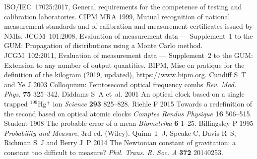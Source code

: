 \documentclass[11pt]{article}
\theoremstyle{plain}
\theoremstyle{definition}
\theoremstyle{remark}
\begin{document}
\begin{thebibliography}{9}
 ISO/IEC~17025:2017, General requirements for the competence of testing and calibration laboratories.
 CIPM MRA 1999, Mutual recognition of national measurement standards and of calibration and measurement certificates issued by NMIs.
 JCGM~101:2008, Evaluation of measurement data — Supplement~1 to the GUM: Propagation of distributions using a Monte Carlo method.
 JCGM~102:2011, Evaluation of measurement data — Supplement~2 to the GUM: Extension to any number of output quantities.
 BIPM, Mise en pratique for the definition of the kilogram (2019, updated), \url{https://www.bipm.org}.
 Cundiff S~T and Ye J 2003 Colloquium: Femtosecond optical frequency combs \textit{Rev. Mod. Phys.} \textbf{75} 325–342.
 Diddams S~A et~al. 2001 An optical clock based on a single trapped $^{199}$Hg$^+$ ion \textit{Science} \textbf{293} 825–828.
 Riehle F 2015 Towards a redefinition of the second based on optical atomic clocks \textit{Comptes Rendus Physique} \textbf{16} 506–515.
 Student 1908 The probable error of a mean \textit{Biometrika} \textbf{6} 1–25.
 Billingsley P 1995 \textit{Probability and Measure}, 3rd ed. (Wiley).
 Quinn T~J, Speake C, Davis R~S, Richman S~J and Berry J~P 2014 The Newtonian constant of gravitation: a constant too difficult to measure? \textit{Phil. Trans. R. Soc. A} \textbf{372} 20140253.
\end{thebibliography}
\end{document}

